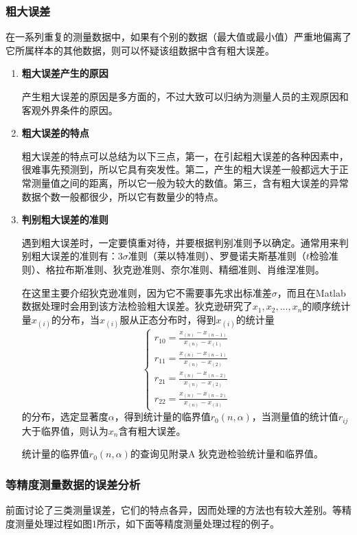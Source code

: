 \subsubsection{粗大误差}
在一系列重复的测量数据中，如果有个别的数据（最大值或最小值）严重地偏离了它所属样本的其他数据，则可以怀疑该组数据中含有粗大误差。
\begin{enumerate}
	\item \textbf{粗大误差产生的原因}
	
	\qquad 产生粗大误差的原因是多方面的，不过大致可以归纳为测量人员的主观原因和客观外界条件的原因。
	\item \textbf{粗大误差的特点}
	
	\qquad 粗大误差的特点可以总结为以下三点，第一，在引起粗大误差的各种因素中，很难事先预测到，所以它具有突发性。第二，产生的粗大误差一般都远大于正常测量值之间的距离，所以它一般为较大的数值。第三，含有粗大误差的异常数据个数一般都很少，所以它有数量少的特点。
	\item \textbf{判别粗大误差的准则}
	
	\qquad 遇到粗大误差时，一定要慎重对待，并要根据判别准则予以确定。通常用来判别粗大误差的准则有：$ 3\sigma $准则（莱以特准则）、罗曼诺夫斯基准则（$ t $检验准则）、格拉布斯准则、狄克逊准则、奈尔准则、精细准则、肖维涅准则。
	
	\qquad 在这里主要介绍狄克逊准则，因为它不需要事先求出标准差$ \sigma $，而且在Matlab数据处理时会用到该方法检验粗大误差。狄克逊研究了$ x_1,x_2,...,x_n $的顺序统计量$ x_{(i)} $的分布，当$ x_{(i)} $服从正态分布时，得到$ x_{(i)} $的统计量
	\[ \begin{cases}
		r_{10}=\frac{x_{(n)}-x_{(n-1)}}{x_{(n)}-x_{(1)}}\\
		r_{11}=\frac{x_{(n)}-x_{(n-1)}}{x_{(n)}-x_{(2)}}\\
		r_{21}=\frac{x_{(n)}-x_{(n-2)}}{x_{(n)}-x_{(2)}}\\
		r_{22}=\frac{x_{(n)}-x_{(n-2)}}{x_{(n)}-x_{(3)}}
	\end{cases} \]
	的分布，选定显著度$ \alpha $，得到统计量的临界值$ r_0(n,\alpha) $，当测量值的统计值$ r_{ij} $大于临界值，则认为$ x_n $含有粗大误差。
	
	\qquad 统计量的临界值$ r_0(n,\alpha) $的查询见附录A 狄克逊检验统计量和临界值。
\end{enumerate}

\subsubsection{等精度测量数据的误差分析}
前面讨论了三类测量误差，它们的特点各异，因而处理的方法也有较大差别。等精度测量处理过程如图1所示，如下面等精度测量处理过程的例子。
